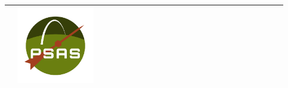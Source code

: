 \documentclass[11pt,twoside,a4paper,openright]{report}
\begin{document}
\begin{titlepage}
\begin{table}[!t]
\begin{tabular}{  p{2cm}  m{13.20337cm}  p{2cm}  }
&	

\begin{minipage}{.3\textwidth}
      \includegraphics[width=0.3\textwidth]{psas_insignia.png}
    \end{minipage}\\ \hline
   
\end{tabular}
\end{table}


\end{titlepage}
\newpage
\thispagestyle{empty}
\end{document}
